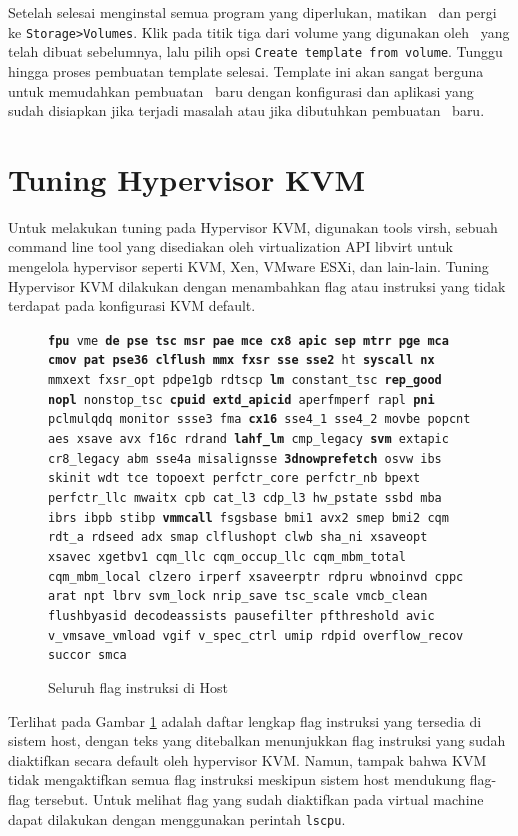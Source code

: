 Setelah selesai menginstal semua program yang diperlukan, matikan \vm\ dan pergi ke \texttt{Storage>Volumes}. Klik pada titik tiga dari volume yang digunakan oleh \vm\ yang telah dibuat sebelumnya, lalu pilih opsi \texttt{Create template from volume}. Tunggu hingga proses pembuatan template selesai. Template ini akan sangat berguna untuk memudahkan pembuatan \vm\ baru dengan konfigurasi dan aplikasi yang sudah disiapkan jika terjadi masalah atau jika dibutuhkan pembuatan \vm\ baru.

\section{Tuning Hypervisor KVM}
Untuk melakukan tuning pada Hypervisor KVM, digunakan tools virsh, sebuah command line tool yang disediakan oleh virtualization API libvirt untuk mengelola hypervisor seperti KVM, Xen, VMware ESXi, dan lain-lain. Tuning Hypervisor KVM dilakukan dengan menambahkan flag atau instruksi yang tidak terdapat pada konfigurasi KVM default.

\begin{figure}
    \texttt{\textbf{fpu} vme \textbf{de pse tsc msr pae mce cx8 apic sep mtrr pge mca cmov pat pse36 clflush mmx fxsr sse sse2} ht \textbf{syscall nx} mmxext fxsr\_opt pdpe1gb rdtscp \textbf{lm} constant\_tsc \textbf{rep\_good} \textbf{nopl} nonstop\_tsc \textbf{cpuid extd\_apicid} aperfmperf rapl \textbf{pni} pclmulqdq monitor ssse3 fma \textbf{cx16} sse4\_1 sse4\_2 movbe popcnt aes xsave avx f16c rdrand \textbf{lahf\_lm} cmp\_legacy \textbf{svm} extapic cr8\_legacy abm sse4a misalignsse \textbf{3dnowprefetch} osvw ibs skinit wdt tce topoext perfctr\_core perfctr\_nb bpext perfctr\_llc mwaitx cpb cat\_l3 cdp\_l3 hw\_pstate ssbd mba ibrs ibpb stibp \textbf{vmmcall} fsgsbase bmi1 avx2 smep bmi2 cqm rdt\_a rdseed adx smap clflushopt clwb sha\_ni xsaveopt xsavec xgetbv1 cqm\_llc cqm\_occup\_llc cqm\_mbm\_total cqm\_mbm\_local clzero irperf xsaveerptr rdpru wbnoinvd cppc arat npt lbrv svm\_lock nrip\_save tsc\_scale vmcb\_clean flushbyasid decodeassists pausefilter pfthreshold avic v\_vmsave\_vmload vgif v\_spec\_ctrl umip rdpid overflow\_recov succor smca}
    \caption{Seluruh flag instruksi di Host}
    \label{fig:flag_kvm_host}
\end{figure}

Terlihat pada Gambar \ref{fig:flag_kvm_host} adalah daftar lengkap flag instruksi yang tersedia di sistem host, dengan teks yang ditebalkan menunjukkan flag instruksi yang sudah diaktifkan secara default oleh hypervisor KVM. Namun, tampak bahwa KVM tidak mengaktifkan semua flag instruksi meskipun sistem host mendukung flag-flag tersebut. Untuk melihat flag yang sudah diaktifkan pada virtual machine dapat dilakukan dengan menggunakan perintah \texttt{lscpu}.

